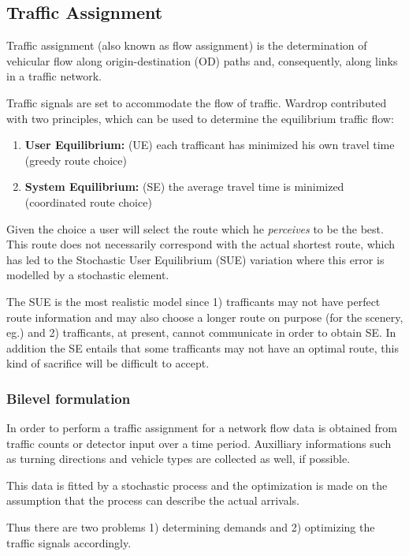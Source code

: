\subsection{Traffic Assignment}
\label{sec:usereq}

Traffic assignment (also known as flow assignment) is the
determination of vehicular flow along origin-destination (OD) paths
and, consequently, along links in a traffic network.

Traffic signals are set to accommodate the flow of traffic. Wardrop
contributed with two principles, which can be used to determine the
equilibrium traffic flow:

\begin{enumerate}
\item \textbf{User Equilibrium:} (UE) each trafficant has minimized his own travel time (greedy route choice)
\item \textbf{System Equilibrium:} (SE) the average travel time is minimized (coordinated route choice)
\end{enumerate}

Given the choice a user will select the route which he
\textit{perceives} to be the best. This route does not necessarily
correspond with the actual shortest route, which has led to the
Stochastic User Equilibrium (SUE) variation \cite{32} where this error
is modelled by a stochastic element.

The SUE is the most realistic model since 1) trafficants may not have
perfect route information and may also choose a longer route on
purpose (for the scenery, eg.) and 2) trafficants, at present, cannot
communicate in order to obtain SE. In addition the SE entails that
some trafficants may not have an optimal route, this kind of sacrifice
will be difficult to accept.

\subsubsection*{Bilevel formulation}
\label{sec:bilevel}

In order to perform a traffic assignment for a network flow data is
obtained from traffic counts or detector input over a time
period. Auxilliary informations such as turning directions and vehicle
types are collected as well, if possible.

This data is fitted by a stochastic process and the optimization is
made on the assumption that the process can describe the actual
arrivals.

Thus there are two problems 1) determining demands and 2) optimizing
the traffic signals accordingly.

